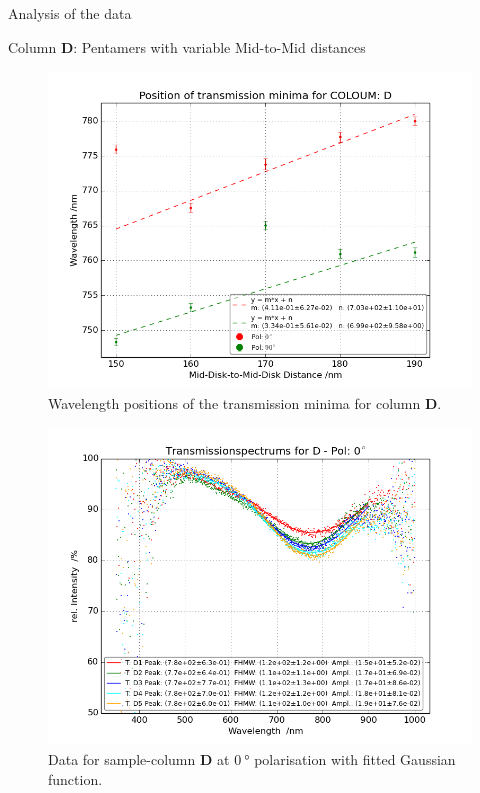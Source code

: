 \documentclass[pdftex, a4paper,11pt, twoside, UKenglish]{report}
\begin{document}
\begin{chapter}{Analysis of the data}
\begin{section}{Column \textbf{D}: Pentamers with variable Mid-to-Mid
        distances}
      \begin{figure}[b!]
        \centering
        \includegraphics[width=\textwidth]{Figures/MinimaPosD.png}
        \caption{Wavelength positions of the transmission minima for column
            \textbf{D}.}
        \label{fig:MinimaPosD}
      \end{figure}
      \newpage
      \begin{figure}[ht!]
        \centering
        \begin{minipage}{.95\textwidth}
          \centering
          \includegraphics[width=\textwidth]
              {Figures/TransspecFIT_DPol0.png}
          \caption{Data for sample-column \textbf{D} at $\SI{0}{\degree}$
              polarisation with fitted Gaussian function.}

\end{minipage}
\end{figure}
\end{section}
\end{chapter}
\end{document}
